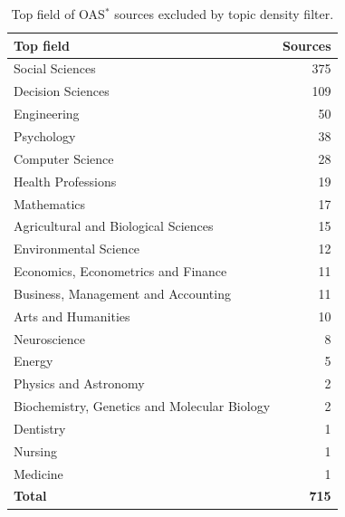 \begin{table}[htbp]
\centering
\caption{Top field of OAS$^*$ sources excluded by topic density filter.}
\label{tab:oas_dropped}
\begin{tabular}{lr}
\toprule
\textbf{Top field} & \textbf{Sources} \\
\midrule
Social Sciences & 375 \\
Decision Sciences & 109 \\
Engineering & 50 \\
Psychology & 38 \\
Computer Science & 28 \\
Health Professions & 19 \\
Mathematics & 17 \\
Agricultural and Biological Sciences & 15 \\
Environmental Science & 12 \\
Economics, Econometrics and Finance & 11 \\
Business, Management and Accounting & 11 \\
Arts and Humanities & 10 \\
Neuroscience & 8 \\
Energy & 5 \\
Physics and Astronomy & 2 \\
Biochemistry, Genetics and Molecular Biology & 2 \\
Dentistry & 1 \\
Nursing & 1 \\
Medicine & 1 \\
\midrule
\textbf{Total} & \textbf{715} \\
\bottomrule
\end{tabular}
\end{table}
